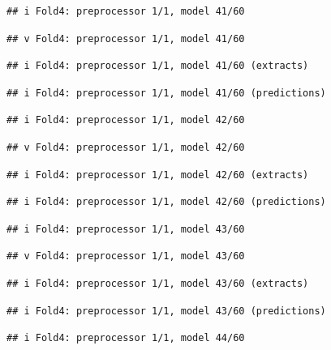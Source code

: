 \documentclass[
]{article}
\begin{document}
\begin{verbatim}
## i Fold4: preprocessor 1/1, model 41/60
\end{verbatim}

\begin{verbatim}
## v Fold4: preprocessor 1/1, model 41/60
\end{verbatim}

\begin{verbatim}
## i Fold4: preprocessor 1/1, model 41/60 (extracts)
\end{verbatim}

\begin{verbatim}
## i Fold4: preprocessor 1/1, model 41/60 (predictions)
\end{verbatim}

\begin{verbatim}
## i Fold4: preprocessor 1/1, model 42/60
\end{verbatim}

\begin{verbatim}
## v Fold4: preprocessor 1/1, model 42/60
\end{verbatim}

\begin{verbatim}
## i Fold4: preprocessor 1/1, model 42/60 (extracts)
\end{verbatim}

\begin{verbatim}
## i Fold4: preprocessor 1/1, model 42/60 (predictions)
\end{verbatim}

\begin{verbatim}
## i Fold4: preprocessor 1/1, model 43/60
\end{verbatim}

\begin{verbatim}
## v Fold4: preprocessor 1/1, model 43/60
\end{verbatim}

\begin{verbatim}
## i Fold4: preprocessor 1/1, model 43/60 (extracts)
\end{verbatim}

\begin{verbatim}
## i Fold4: preprocessor 1/1, model 43/60 (predictions)
\end{verbatim}

\begin{verbatim}
## i Fold4: preprocessor 1/1, model 44/60
\end{verbatim}
\end{document}

